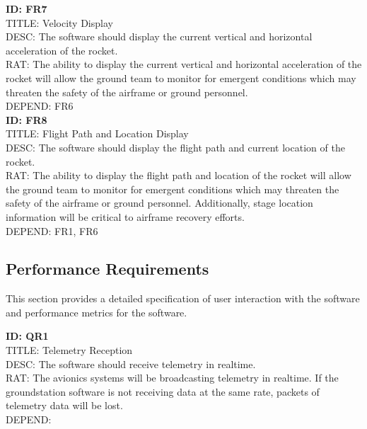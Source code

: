 \documentclass[onecolumn, draftclsnofoot,10pt, compsoc]{IEEEtran}
\begin{document}
			\noindent
			\textbf{ID: FR7}\\
			TITLE: Velocity Display\\
			DESC: The software should display the current vertical and horizontal acceleration of the rocket.\\
			RAT: The ability to display the current vertical and horizontal acceleration of the rocket will allow the ground team to monitor for emergent conditions which may threaten the safety of the airframe or ground personnel.\\
			DEPEND: FR6\\
			
			\noindent
			\textbf{ID: FR8}\\
			TITLE: Flight Path and Location Display\\
			DESC: The software should display the flight path and current location of the rocket.\\
			RAT: The ability to display the flight path and location of the rocket will allow the ground team to monitor for emergent conditions which may threaten the safety of the airframe or ground personnel.
				Additionally, stage location information will be critical to airframe recovery efforts.\\
			DEPEND: FR1, FR6\\
		
		\subsection{Performance Requirements}
			This section provides a detailed specification of user interaction with the software and performance metrics for the software.
		
			\noindent
			\textbf{ID: QR1}\\
			TITLE: Telemetry Reception\\
			DESC: The software should receive telemetry in realtime.\\
			RAT: The avionics systems will be broadcasting telemetry in realtime. 
				If the groundstation software is not receiving data at the same rate, packets of telemetry data will be lost.\\
			DEPEND: \\
			
\end{document}
